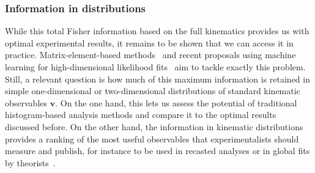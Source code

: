 \subsubsection{Information in distributions}

While this total Fisher information based on the full kinematics
provides us with optimal experimental results, it remains to be shown
that we can access it in practice. Matrix-element-based
methods~\cite{Kondo:1988yd, Abazov:2004cs, Gao:2010qx, Alwall:2010cq,
  Avery:2012um, Andersen:2012kn, Campbell:2013hz, Artoisenet:2013vfa,
  Martini:2015fsa, Gritsan:2016hjl, Soper:2011cr, Soper:2012pb,
  Soper:2014rya, Atwood:1991ka, Davier:1992nw, Diehl:1993br} and
recent proposals using machine learning for high-dimensional
likelihood fits~\cite{Cranmer:2015bka, Cranmer:2016lzt} aim to tackle
exactly this problem. Still, a relevant question is how much of this
maximum information is retained in simple one-dimensional or
two-dimensional distributions of standard kinematic observables
$\mathbf{v}$. On the one hand, this lets us assess the potential of
traditional histogram-based analysis methods and compare it to the
optimal results discussed before. On the other hand, the information
in kinematic distributions provides a ranking of the most useful
observables that experimentalists should measure and publish, for
instance to be used in recasted analyses or in global fits by
theorists~\cite{Corbett:2015ksa, Butter:2016cvz}.

